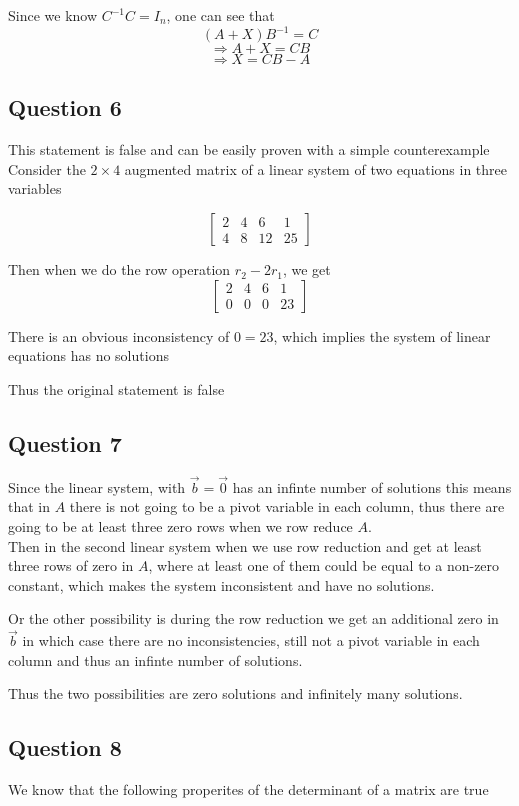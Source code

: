 \documentclass{article}
\begin{document}
Since we know \(C^{-1}C =I_n\), one can see that
\[
(A+X)B^{-1} = C
\]
\[
\Rightarrow A+X = CB
\]
\[
\Rightarrow X = CB - A
\]

\subsection*{Question 6}
This statement is false and can be easily proven with a simple counterexample
\\

Consider the \(2 \times 4 \) augmented matrix of a linear system of two equations in 
three variables

\[
\begin{bmatrix}
    2 & 4 & 6 & 1 \\
    4 & 8 & 12 & 25
\end{bmatrix}
\]

Then when we do the row operation \(r_2 - 2r_1\), we get
\[
\begin{bmatrix}
    2 & 4 & 6 & 1 \\
    0 & 0 & 0 & 23
\end{bmatrix}
\]

There is an obvious inconsistency of \(0 = 23\), which implies the system of linear equations has no solutions

Thus the original statement is false

\subsection*{Question 7}
Since the linear system, with \(\vec{b} = \vec{0}\) has an infinte number of solutions this means that in \(A\) there is not going 
to be a pivot variable in each column, thus there are going to be at least three zero rows when we row reduce \(A\).
\\

Then in the second linear system when we use row reduction and get at least three rows of zero in \(A\), where at least one of them could be equal to a 
non-zero constant, which makes the system inconsistent and have no solutions. 

Or the other possibility is during the row reduction we get an additional zero in \(\vec{b}\) in which
case there are no inconsistencies, still not a pivot variable in each column and thus an infinte number of solutions.

Thus the two possibilities are zero solutions and infinitely many solutions.

\subsection*{Question 8}
We know that the following properites of the determinant of a matrix are true
\end{document}
